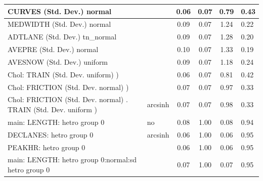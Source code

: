 \begin{table}
\begin{center}
\begin{tabular}{|l|l|c|c|c|l|}
			\hline
			CURVES (Std. Dev.) normal &  & 0.06 & 0.07 & 0.79 & 0.43 \\
			\hline
			MEDWIDTH (Std. Dev.) normal &  & 0.09 & 0.07 & 1.24 & 0.22 \\
			\hline
			ADTLANE (Std. Dev.) tn_normal &  & 0.09 & 0.07 & 1.28 & 0.20 \\
			\hline
			AVEPRE (Std. Dev.) normal &  & 0.10 & 0.07 & 1.33 & 0.19 \\
			\hline
			AVESNOW (Std. Dev.) uniform &  & 0.09 & 0.07 & 1.18 & 0.24 \\
			\hline
			 Chol: TRAIN (Std. Dev. uniform) ) &  & 0.06 & 0.07 & 0.81 & 0.42 \\
			\hline
			 Chol: FRICTION (Std. Dev. normal) ) &  & 0.07 & 0.07 & 0.97 & 0.33 \\
			\hline
			 Chol: FRICTION (Std. Dev. normal) . TRAIN (Std. Dev.   uniform ) & arcsinh & 0.07 & 0.07 & 0.98 & 0.33 \\
			\hline
			main: LENGTH: hetro group 0 & no & 0.08 & 1.00 & 0.08 & 0.94 \\
			\hline
			DECLANES: hetro group 0 & arcsinh & 0.06 & 1.00 & 0.06 & 0.95 \\
			\hline
			PEAKHR: hetro group 0 &  & 0.06 & 1.00 & 0.06 & 0.95 \\
			\hline
			main: LENGTH: hetro group 0:normal:sd  hetro group 0 &  & 0.07 & 1.00 & 0.07 & 0.95 \\
			\hline
		\end{tabular}
	\end{center}
\end{table}